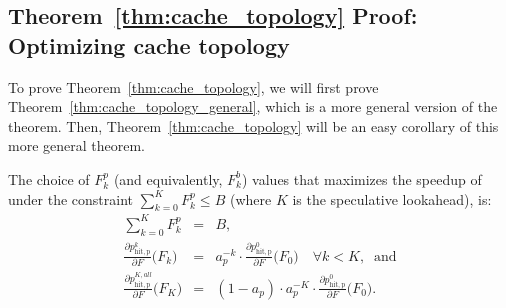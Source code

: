 \subsection{Theorem~\ref{thm:cache_topology} Proof: Optimizing \Sys cache topology}

To prove Theorem~\ref{thm:cache_topology}, we will first prove Theorem~\ref{thm:cache_topology_general}, which is a more general version of the theorem.
Then, Theorem~\ref{thm:cache_topology} will be an easy corollary of this more general theorem.


\begin{theorem}
\label{thm:cache_topology_general}
The choice of $F_k^p$ (and equivalently, $F_k^b$) values that maximizes the speedup of \Sys under the constraint $\sum_{k=0}^K F_k^p \leq B$ (where $K$ is the speculative lookahead), is:
\begin{eqnarray*}
\sum_{k=0}^K F_k^p &=& B, \\
\frac{\partial p_{\mathrm{hit,p}}^{k}}{\partial F}\big(F_k\big) &=& a_p^{-k}\cdot \frac{\partial p_{\mathrm{hit,p}}^{0}}{\partial F}\big(F_0\big) \quad \forall k < K, \;\; \text{and} \\
\frac{\partial p_{\mathrm{hit,p}}^{K,all}}{\partial F}\big(F_K\big) &=& (1-a_p) \cdot a_p^{-K}\cdot \frac{\partial p_{\mathrm{hit,p}}^{0}}{\partial F}\big(F_0\big). \\
\end{eqnarray*}
\end{theorem}


